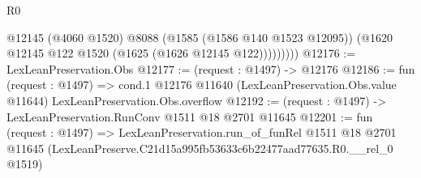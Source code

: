 \begin{lexlean}{R0}
\begin{coremodule}
                @12145
                (@4060 @1520)
                @8088
                (@1585 (@1586 @140 @1523 @12095))
                (@1620 @12145 @122 @1520 (@1625 (@1626 @12145 @122)))))))))
@12176 := LexLeanPreservation.Obs
@12177 := (request : @1497) -> @12176
@12186 := fun (request : @1497) =>
  cond.{1} @12176 @11640 (LexLeanPreservation.Obs.value @11644) LexLeanPreservation.Obs.overflow
@12192 := (request : @1497) -> LexLeanPreservation.RunConv @1511 @18 @2701 @11645
@12201 := fun (request : @1497) =>
  LexLeanPreservation.run_of_funRel
    @1511
    @18
    @2701
    @11645
    (LexLeanPreserve.C21d15a995fb53633c6b22477aad77635.R0.__rel_0 @1519)
\end{coremodule}
\end{lexlean}

